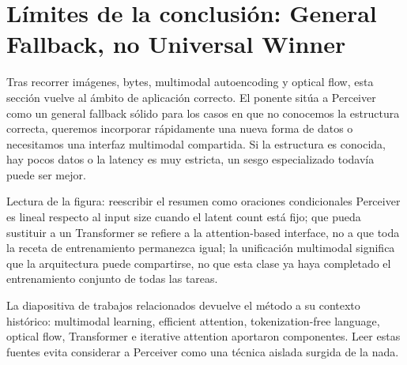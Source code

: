 \section{Límites de la conclusión: General Fallback, no Universal Winner}

Tras recorrer imágenes, bytes, multimodal autoencoding y optical flow, esta sección vuelve al ámbito de aplicación correcto. El ponente sitúa a Perceiver como un general fallback sólido para los casos en que no conocemos la estructura correcta, queremos incorporar rápidamente una nueva forma de datos o necesitamos una interfaz multimodal compartida. Si la estructura es conocida, hay pocos datos o la latency es muy estricta, un sesgo especializado todavía puede ser mejor.


\begin{knowledgebox}{Lectura de la figura: reescribir el resumen como oraciones condicionales}
Perceiver es lineal respecto al input size cuando el latent count está fijo; que pueda sustituir a un Transformer se refiere a la attention-based interface, no a que toda la receta de entrenamiento permanezca igual; la unificación multimodal significa que la arquitectura puede compartirse, no que esta clase ya haya completado el entrenamiento conjunto de todas las tareas.
\end{knowledgebox}


La diapositiva de trabajos relacionados devuelve el método a su contexto histórico: multimodal learning, efficient attention, tokenization-free language, optical flow, Transformer e iterative attention aportaron componentes. Leer estas fuentes evita considerar a Perceiver como una técnica aislada surgida de la nada.


